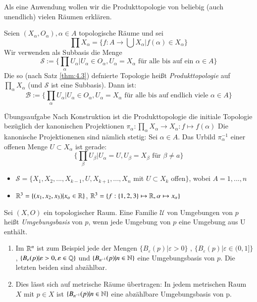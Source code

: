 \documentclass[a4paper,10pt]{scrartcl}
\newcommand{\eps}{\varepsilon}
\renewcommand{\bigsqcap}{\prod}
\begin{document}
Als eine Anwendung wollen wir die Produkttopologie von beliebig (auch unendlich) vielen Räumen erklären.

Seien $(X_\alpha,O_\alpha), \alpha \in A$ topologische Räume und sei
\[
 \bigsqcap X_\alpha=\{f:A\to\bigcup X_\alpha|f(\alpha)\in X_\alpha\}
\]
Wir verwenden als Subbasis die Menge
\[
 \mathcal S:=\{\bigsqcap_\alpha U_\alpha|U_\alpha \in O_\alpha, U_\alpha=X_\alpha \text{ für alle bis auf ein $\alpha \in A$}\}
\]
Die so (nach Satz \ref{thm:4.3}) defnierte Topologie heißt \emph{Produkttopologie} auf $\bigsqcap_\alpha X_\alpha$ (und 
$\mathcal S$ ist eine Subbasis). Dann ist:
\[
 \mathcal B := \{ \bigsqcap_\alpha U_\alpha|U_\alpha\in O_\alpha, U_\alpha=X_\alpha \text{ für alle bis auf endlich viele } \alpha \in A\}
\]
\begin{seg}{Übungsaufgabe}
 Nach Konstruktion ist die Produkttopologie die initiale Topologie bezüglich der kanonischen Projektionen $\pi_\alpha:\bigsqcap_\alpha X_\alpha\to X_\alpha: f\mapsto f(\alpha)$
Die kanonische Projektionenen sind nämlich stetig: Sei $\alpha \in A$. Das Urbild $\pi_\alpha^{-1}$ einer offenen Menge $U\subset X_\alpha$ ist gerade:
\[
 \{\bigsqcap_\beta U_\beta|U_\alpha=U, U_\beta=X_\beta \text{ für } \beta\neq a\}
\]

\end{seg}
\begin{note*}
 \begin{itemize}
  \item $\mathcal S=\{X_1,X_2,...,X_{k-1}, U, X_{k+1},...,X_n$ mit $U\subset X_k$ offen$ \} $, wobei $A={1,...,n}$
  \item $\mathbb{R}^3=\{(x_1,x_2,x_3)|x_\alpha\in \mathbb{R}\}$, $\mathbb{R}^3=\{f:\{1,2,3\}\mapsto \mathbb{R}, \alpha\mapsto x_\alpha\}$
 \end{itemize}
\end{note*}
\begin{df}
 Sei $(X,O)$ ein topologischer Raum. Eine Familie $\mathcal U$ von Umgebungen von $p$ heißt \emph{Umgebungsbasis} von $p$, wenn jede Umgebung von $p$ eine Umgebung aus U enthält.
\fixme[fig25]
\end{df}
\begin{exs*}
 \begin{enumerate}
\item  Im $\mathbb{R}^n$ ist zum Beispiel jede der Mengen $\{B_\eps(p)|\eps>0\}$ , $ \{B_\eps(p)|\eps\in (0,1]\}$, $\{ B_\eps(p)|\eps>0,\eps\in \Q \}$ und $\{B_{n^{-1}}(p)|n\in \mathbb{N}\}$ eine Umgebungsbasis von $p$. Die letzten beiden sind abzählbar.
\item Dies lässt sich auf metrische Räume übertragen: In jedem metrischen Raum $X$ mit $p\in X$ ist $\{B_{n^{-1}}(p)|n\in \mathbb{N}\}$ eine abzählbare Umgebungsbasis von p.
 \end{enumerate}
\end{exs*}
\end{document}
